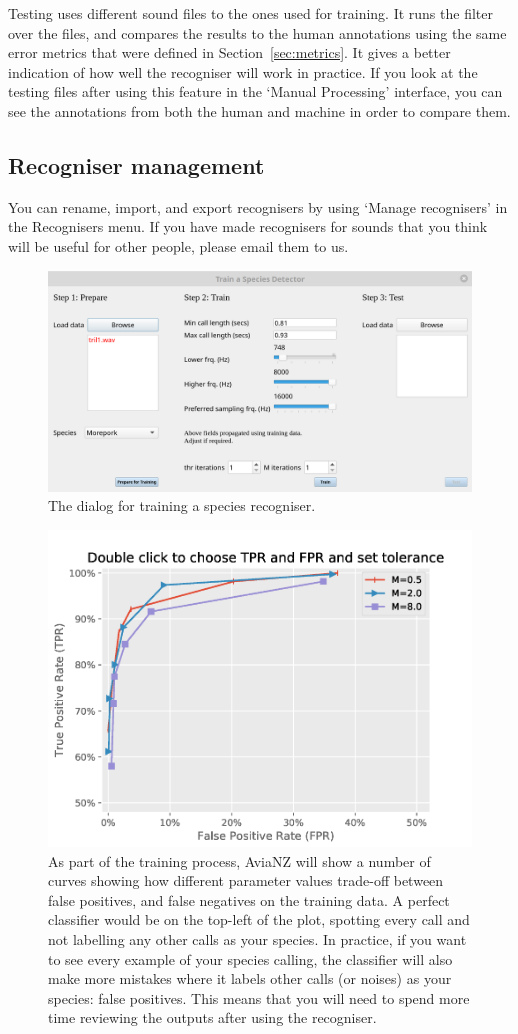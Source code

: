 \documentclass{article}
\begin{document}
Testing uses different sound files to the ones used for training. It runs the filter over the files, and compares the results to the human annotations using the same error metrics that were defined in Section~\ref{sec:metrics}. It gives a better indication of how well the recogniser will work in practice. If you look at the testing files after using this feature in the `Manual Processing' interface, you can see the annotations from both the human and machine in order to compare them. 

\subsection{Recogniser management}

You can rename, import, and export recognisers by using `Manage recognisers' in the Recognisers menu. If you have made recognisers for sounds that you think will be useful for other people, please email them to us. 

    \begin{figure}
    \centering
    \includegraphics[width=.6\textwidth]{Figs/train}
    \caption{The dialog for training a species recogniser.}
    \label{fig:train}
    \end{figure}

    \begin{figure}
    \centering
    \includegraphics[width=.4\textwidth]{Figs/ROC_Curve_zoom}
    \caption{As part of the training process, AviaNZ will show a number of curves showing how different parameter values trade-off between false positives, and false negatives on the training data. A perfect classifier would be on the top-left of the plot, spotting every call and not labelling any other calls as your species. In practice, if you want to see every example of your species calling, the classifier will also make more mistakes where it labels other calls (or noises) as your species: false positives. This means that you will need to spend more time reviewing the outputs after using the recogniser. }
    \label{fig:selectfilter}
    \end{figure}
   
\end{document}
